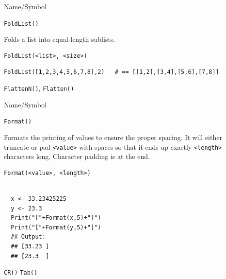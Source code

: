 \begin{desc}{Name/Symbol}
\item[Name/Symbol]	\verb+FoldList()+

\item[Description]	Folds a list into equal-length sublists.

\item[Usage]
\begin{verbatim}
FoldList(<list>, <size>)
\end{verbatim}

\item[Example]
\begin{verbatim}
FoldList([1,2,3,4,5,6,7,8],2)	# == [[1,2],[3,4],[5,6],[7,8]]
\end{verbatim}
 
\item[See Also]	\verb+FlattenN()+, \verb+Flatten()+
\end{desc}


\begin{desc}{Name/Symbol}
\item[Name/Symbol]	\verb+Format()+            

\item[Description]	Formats the printing of values to ensure the
  proper spacing. It will either truncate or pad \verb+<value>+ with spaces
  so that it ends up exactly \verb+<length>+ characters long.  Character
  padding is at the end.
 
\item[Usage]
\begin{verbatim}
Format(<value>, <length>)
\end{verbatim}

\item[Example]	
\begin{verbatim}

  x <- 33.23425225
  y <- 23.3
  Print("["+Format(x,5)+"]")
  Print("["+Format(y,5)+"]")
  ## Output: 
  ## [33.23 ]
  ## [23.3  ]
\end{verbatim}
         

\item[See Also]	
\verb+CR()+ \verb+Tab()+
\end{desc}

\vfill
\newpage
{}
\vfill


